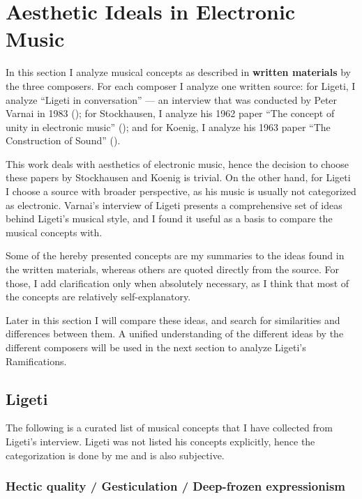 \documentclass[a4paper,11pt]{article}
\begin{document}
\section{Aesthetic Ideals in Electronic Music}
\label{sec:aesthetic_ideals_in_electronic_music}

In this section I analyze musical concepts as described in \textbf{written materials} by the three composers.
For each composer I analyze one written source:
for Ligeti, I analyze ``Ligeti in conversation'' --- an interview that was conducted by Peter Varnai in 1983 (\citeauthor{varnai});
for Stockhausen, I analyze his 1962 paper ``The concept of unity in electronic music'' (\citeauthor{stockhausen});
and for Koenig, I analyze his 1963 paper ``The Construction of Sound'' (\citeauthor{koenig}).

This work deals with aesthetics of electronic music, hence the decision to choose these papers by Stockhausen and Koenig is trivial.
On the other hand, for Ligeti I choose a source with broader perspective, as his music is usually not categorized as electronic.
Varnai's interview of Ligeti presents a comprehensive set of ideas behind Ligeti's musical style, and I found it useful as a basis to compare the musical concepts with.

Some of the hereby presented concepts are my summaries to the ideas found in the written materials, whereas others are quoted directly from the source.
For those, I add clarification only when absolutely necessary, as I think that most of the concepts are relatively self-explanatory.

Later in this section I will compare these ideas, and search for similarities and differences between them.
A unified understanding of the different ideas by the different composers will be used in the next section to analyze  Ligeti's Ramifications.

\subsection{Ligeti}
\label{sub:eshtetic_ligeti}

The following is a curated list of musical concepts that I have collected from Ligeti's interview.
Ligeti was not listed his concepts explicitly, hence the categorization is done by me and is also subjective.

\subsubsection{Hectic quality / Gesticulation / Deep-frozen expressionism}
\label{subs:ligeti:hectic}
\end{document}
